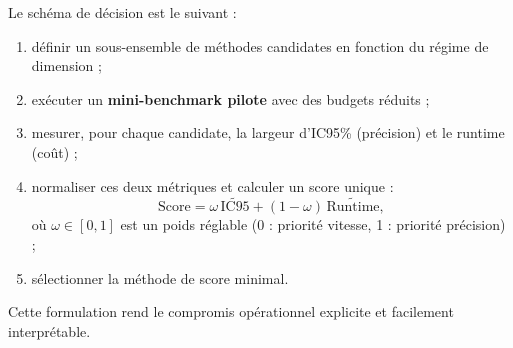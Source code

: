 ﻿\documentclass[11pt,a4paper]{article}
\begin{document}
Le schéma de décision est le suivant :
\begin{enumerate}
    \item définir un sous-ensemble de méthodes candidates en fonction du régime de dimension ;
    \item exécuter un \textbf{mini-benchmark pilote} avec des budgets réduits ;
    \item mesurer, pour chaque candidate, la largeur d'IC95\% (précision) et le runtime (coût) ;
    \item normaliser ces deux métriques et calculer un score unique :
    \[
    \mathrm{Score}=\omega\,\widetilde{\mathrm{IC95}}+(1-\omega)\,\widetilde{\mathrm{Runtime}},
    \]
    où $\omega\in[0,1]$ est un poids réglable (0 : priorité vitesse, 1 : priorité précision) ;
    \item sélectionner la méthode de score minimal.
\end{enumerate}

Cette formulation rend le compromis opérationnel explicite et facilement interprétable.
\end{document}
